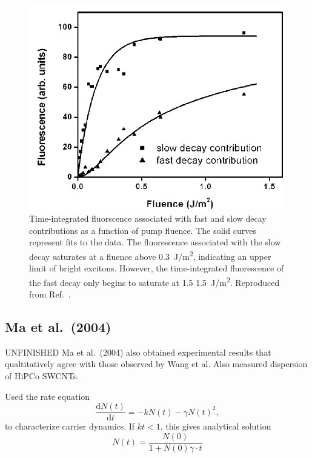 \begin{figure}[ht]
	\centering
	\includegraphics[scale=0.3]{images/chapter_prior_works/fast_slow_wang_2004}
	\caption{Time-integrated fluorscence associated with fast and slow decay contributions as a function of pump fluence. The solid curves represent fits to the data. The fluorescence associated with the slow decay saturates at a fluence above \SI{0.3}{\joule / \meter \squared}, indicating an upper limit of bright excitons. However, the time-integrated fluorescence of the fast decay only begins to saturate at 1.5  \SI{1.5}{\joule / \meter \squared}. Reproduced from Ref.\ \cite{wang2004observation}.}
	\label{fig:fast_slow_wang_2004}
\end{figure}





\subsection{Ma et al.\ (2004)}

{\color{red} UNFINISHED}
Ma et al.\ (2004) also obtained experimental results that qualtitatively agree with those observed by Wang et al. Also measured dispersion of HiPCo SWCNTs.

Used the rate equation
\begin{equation}
	\dfrac{\mathrm{d}N(t)}{\mathrm{d}t} = - k N(t) - \gamma N(t)^2,
\end{equation}
to characterize carrier dynamics. If $kt < 1$, this gives analytical solution
\begin{equation}
	N(t) = \dfrac{N(0)}{1 + N(0)\gamma \cdot t}
\end{equation}

